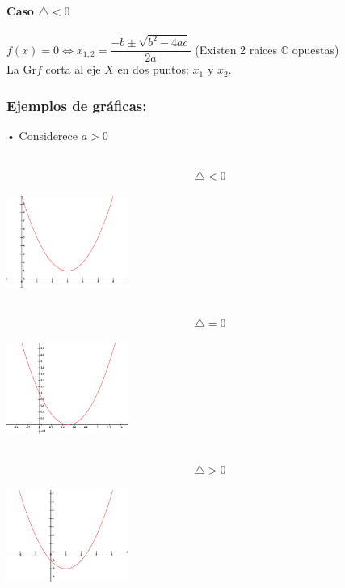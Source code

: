 \paragraph{Caso  $\bigtriangleup < 0$}
\begin{center}
$f(x)=0 \Leftrightarrow x_{1,2}=\dfrac{-b\pm\sqrt{b^{2}-4ac}}{2a}$ \qquad (Existen 2 raices $\mathbb{C}$ opuestas)\\

La Gr$f$ corta al eje $X$ en dos puntos: $x_1$ y $x_2$.
\end{center}
\subsubsection{Ejemplos de gráficas:}

• Considerece $a>0$
\\
\\
\hfill
\begin{minipage}{.20\textwidth}
$$\bigtriangleup<0$$
\includegraphics[height=4cm,width=4cm]{xx1.eps} 

\end{minipage}
\hfill
\begin{minipage}{.20\textwidth}
$$\bigtriangleup=0$$
\includegraphics[height=4cm,width=4cm]{xx4.eps} 
\end{minipage}
\hfill
\begin{minipage}{.20\textwidth}
$$\bigtriangleup>0$$
\includegraphics[height=4cm,width=4cm]{xx5.eps} 

\end{minipage}
\hfill
\\
\\

